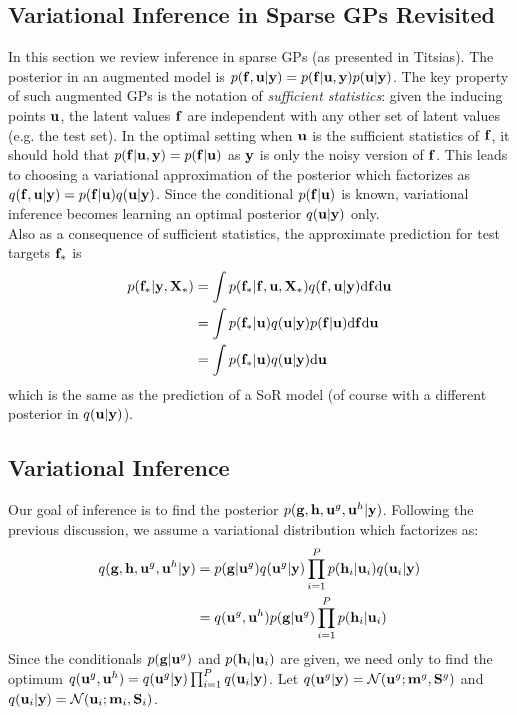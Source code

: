\documentclass{article} %
\begin{document}
\subsection{Variational Inference in Sparse GPs Revisited}
In this section we review inference in sparse GPs (as presented in Titsias).
The posterior in an augmented model is $p(\mathbf{f}, \mathbf{u} | \mathbf{y}) = p(\mathbf{f} | \mathbf{u}, \mathbf{y}) p(\mathbf{u} | \mathbf{y})$.
The key property of such augmented GPs  is the notation of \textit{sufficient statistics}: given the inducing points $\mathbf{u}$, the latent values $\mathbf{f}$ are independent with any other set of latent values (e.g. the test set).
In the optimal setting when $\mathbf{u}$ is the sufficient statistics of $\mathbf{f}$, it should hold that $p(\mathbf{f} | \mathbf{u}, \mathbf{y}) = p(\mathbf{f} | \mathbf{u})$ as $\mathbf{y}$ is only the noisy version of $\mathbf{f}$.
This leads to choosing a variational approximation of the posterior which factorizes as $q(\mathbf{f}, \mathbf{u} | \mathbf{y}) = p(\mathbf{f} | \mathbf{u}) q(\mathbf{u} | \mathbf{y})$.
Since the conditional $p(\mathbf{f} | \mathbf{u})$ is known, variational inference becomes learning an optimal posterior $q(\mathbf{u} | \mathbf{y})$ only. \\

\noindent Also as a consequence of sufficient statistics, the approximate prediction for test targets $\mathbf{f}_*$ is
\begin{align}
\nonumber
p(\mathbf{f}_* | \mathbf{y}, \mathbf{X}_*) &= \int p(\mathbf{f}_* | \mathbf{f}, \mathbf{u}, \mathbf{X}_*) q(\mathbf{f}, \mathbf{u} | \mathbf{y}) \mathrm{d} \mathbf{f} \mathrm{d} \mathbf{u} \\
\nonumber
&= \int p(\mathbf{f}_* | \mathbf{u}) q(\mathbf{u}| \mathbf{y}) p(\mathbf{f} | \mathbf{u}) \mathrm{d} \mathbf{f} \mathrm{d} \mathbf{u} \\
\label{eq:sorprediction}
&= \int p(\mathbf{f}_* | \mathbf{u}) q(\mathbf{u}| \mathbf{y}) \mathrm{d} \mathbf{u}
\end{align}
which is the same as the prediction of a SoR model (of course with a different posterior in $q(\mathbf{u} | \mathbf{y})$). 

\subsection{Variational Inference}
\newcommand{\ug}{\vu^g}
\newcommand{\uh}{\vu^h}
Our goal of inference is to find the posterior $p(\vg, \vh, \ug, \uh | \vy)$. 
Following the previous discussion, we assume a variational distribution which factorizes as:
\begin{align}
\nonumber
q(\vg, \vh, \ug, \uh | \vy)
 &= p(\vg | \ug) q(\ug | \vy) \prod_{i=1}^P p(\vh_i | \vu_i) q(\vu_i | \vy) \\
 &=  q(\ug, \uh) p(\vg | \ug) \prod_{i=1}^P p(\vh_i | \vu_i)
\end{align}
Since the conditionals $p(\vg | \ug)$ and $p(\mathbf{h}_i | \mathbf{u}_i)$ are given, we need only to find the optimum $q(\ug, \uh) = q(\ug | \vy) \prod_{i=1}^P q(\vu_i | \vy)$.
Let $q(\ug | \vy) = \Normal(\ug; \vm^g, \S^g)$ and $q(\mathbf{u}_i | \mathbf{y}) = \mathcal{N}(\mathbf{u}_i; \mathbf{m}_i, \mathbf{S}_i)$. \\
\end{document}
